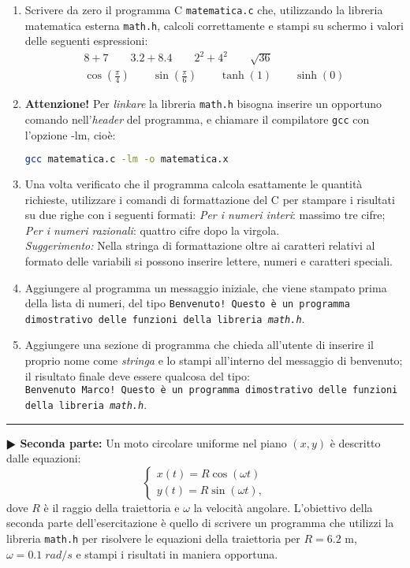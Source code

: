 \documentclass[11pt]{article}
\begin{document}
\begin{enumerate}
\item Scrivere da zero il programma C \texttt{matematica.c} che, utilizzando la libreria matematica esterna \texttt{math.h}, calcoli correttamente e stampi su schermo i valori delle seguenti espressioni:
  \begin{eqnarray*}
    8+7 \qquad  3.2 + 8.4 \qquad 2^2+4^2 \qquad  \sqrt{36}
    \\
    \cos \left(\frac{\pi}{4}\right) \qquad \sin\left(\frac{\pi}{6}\right)
    \qquad
    \tanh\left(1\right) \qquad \sinh\left(0\right)
    \end{eqnarray*}

\item {\bf Attenzione!} Per {\em linkare} la libreria \texttt{math.h} bisogna inserire un opportuno comando
nell'{\em header} del programma, e chiamare il compilatore \texttt{gcc} con l'opzione -lm, cio\`e:\\
\begin{lstlisting}[language=bash]
  gcc matematica.c -lm -o matematica.x
\end{lstlisting} 
\item Una volta verificato che il programma calcola esattamente le quantit\`a richieste, utilizzare i comandi di formattazione del C per stampare i risultati
  su due righe con i seguenti formati: {\em Per i numeri interi}: massimo tre cifre; {\em Per i numeri razionali}: quattro cifre dopo la virgola.
  \\
    {\em Suggerimento:} Nella stringa di formattazione oltre ai caratteri relativi al formato delle variabili si possono
inserire lettere, numeri e caratteri speciali.
    
\item Aggiungere al programma un messaggio iniziale, che viene stampato prima della lista di numeri, del tipo \texttt{Benvenuto! Questo \`e un programma dimostrativo delle funzioni della libreria {\em math.h}}.
\item Aggiungere una sezione di programma che chieda all'utente di inserire il proprio nome come {\em stringa}
e lo stampi all'interno del messaggio di benvenuto; il risultato finale deve essere qualcosa del tipo:\\
\texttt{Benvenuto Marco! Questo \`e un programma dimostrativo delle funzioni della libreria {\em math.h}}.
\end{enumerate}

\hrule
\vspace{1mm}
\textbf{$\RHD$ Seconda parte:} 
Un moto circolare uniforme nel piano $(x,y)$ \`e descritto dalle equazioni:
\[
\left\{ \begin{array}{ll} 
x(t) = R \cos \left(\omega t \right)
\\ 
y(t) = R \sin \left(\omega t \right),
\end{array}
\right.
\]
dove $R$ \`e il raggio della traiettoria e $\omega$ la velocit\`a angolare.
L'obiettivo della seconda parte dell'esercitazione \`e quello di scrivere un programma che utilizzi la libreria \texttt{math.h}
per risolvere le equazioni della traiettoria per $R=6.2$ m, $\omega=0.1 \; rad/s$ e stampi i risultati in maniera opportuna.
\end{document}
